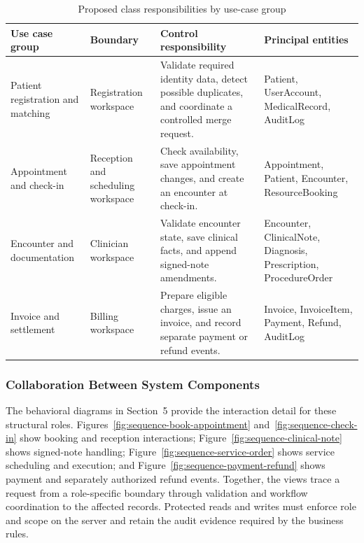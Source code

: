 \documentclass[a4paper,12pt]{article}
\begin{document}
\begin{table}[H]
\centering
\small
\renewcommand{\arraystretch}{1.12}
\begin{tabularx}{\textwidth}{@{}P{0.23\textwidth}P{0.23\textwidth}P{0.26\textwidth}Y@{}}
\toprule
Use case group & Boundary & Control responsibility & Principal entities \\
\midrule
Patient registration and matching & Registration workspace & Validate required identity data, detect possible duplicates, and coordinate a controlled merge request. & Patient, UserAccount, MedicalRecord, AuditLog \\
Appointment and check-in & Reception and scheduling workspace & Check availability, save appointment changes, and create an encounter at check-in. & Appointment, Patient, Encounter, ResourceBooking \\
Encounter and documentation & Clinician workspace & Validate encounter state, save clinical facts, and append signed-note amendments. & Encounter, ClinicalNote, Diagnosis, Prescription, ProcedureOrder \\
Invoice and settlement & Billing workspace & Prepare eligible charges, issue an invoice, and record separate payment or refund events. & Invoice, InvoiceItem, Payment, Refund, AuditLog \\
\bottomrule
\end{tabularx}
\caption{Proposed class responsibilities by use-case group}
\label{tab:use-case-design-participants}
\end{table}

\subsubsection{Collaboration Between System Components}

The behavioral diagrams in Section~5 provide the interaction detail for these structural roles. Figures~\ref{fig:sequence-book-appointment} and~\ref{fig:sequence-check-in} show booking and reception interactions; Figure~\ref{fig:sequence-clinical-note} shows signed-note handling; Figure~\ref{fig:sequence-service-order} shows service scheduling and execution; and Figure~\ref{fig:sequence-payment-refund} shows payment and separately authorized refund events. Together, the views trace a request from a role-specific boundary through validation and workflow coordination to the affected records. Protected reads and writes must enforce role and scope on the server and retain the audit evidence required by the business rules.
\end{document}

